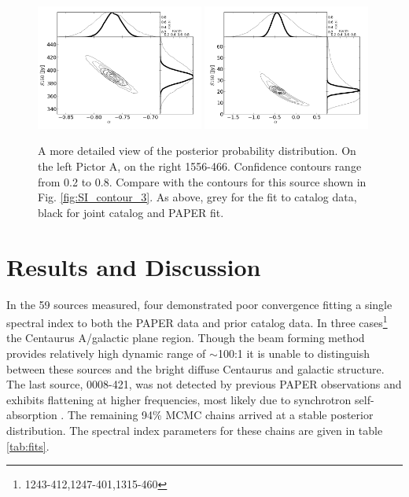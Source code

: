 \documentclass[preprint]{aastex}
\begin{document}
\begin{figure}[htbp]
\includegraphics[width=0.49\textwidth]{plots/pic_trace_hist.png}
\includegraphics[width=0.49\textwidth]{plots/1556-466_trace_hist.png}
\caption{
A more detailed view of the posterior probability distribution. On the left
Pictor A, on the right 1556-466. Confidence contours range from 0.2 to 0.8.
Compare with the contours for this source shown in Fig. \ref{fig:SI_contour_3}.
As above, grey for  the fit to catalog data, black for joint catalog and PAPER
fit.
}
\end{figure}




\section{Results and Discussion}
\label{sec:fits}
In the 59 sources measured, four demonstrated poor convergence fitting a single
spectral index to both the PAPER data and prior catalog data. In three
cases\footnote{1243-412,1247-401,1315-460} %
the Centaurus A/galactic plane region. Though the beam forming method provides
relatively high dynamic range of $\sim$100:1 it is unable to distinguish
between these sources and the bright diffuse Centaurus and galactic structure.
The last source, 0008-421, was not detected by previous PAPER observations and
exhibits flattening at higher frequencies, most likely due to synchrotron
self-absorption \citep{Jacobs:2011p8438} .  The remaining 94\% MCMC chains
arrived at a stable posterior distribution. The spectral index parameters for
these chains are given in table \ref{tab:fits}.
\end{document}
